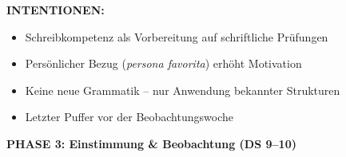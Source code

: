 \documentclass[11pt, a4paper]{article}
\newcommand{\es}[1]{\textcolor{spanisch}{\textit{#1}}}
\begin{document}
\begin{pufferbox}[title={DS 8 -- PUFFER: Creatividad y Juego (Di, 27.01.2026)}]
\vspace{0.2cm}

\textbf{INTENTIONEN:}
\begin{itemize}[leftmargin=1.5em, nosep]
    \item Schreibkompetenz als Vorbereitung auf schriftliche Prüfungen
    \item Persönlicher Bezug (\es{persona favorita}) erhöht Motivation
    \item Keine neue Grammatik -- nur Anwendung bekannter Strukturen
    \item Letzter Puffer vor der Beobachtungswoche
\end{itemize}

\end{pufferbox}

\newpage


\textbf{\Large\color{spanisch} PHASE 3: Einstimmung \& Beobachtung (DS 9--10)}

\vspace{0.3cm}
\end{document}
